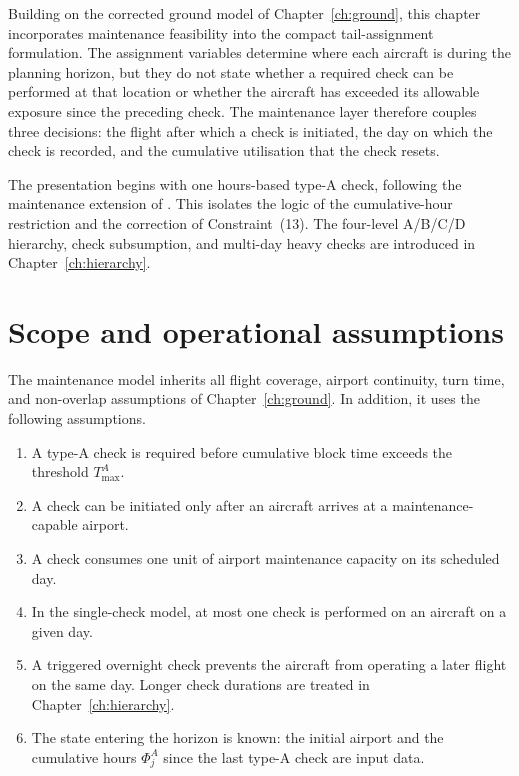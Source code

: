 Building on the corrected ground model of Chapter~\ref{ch:ground}, this
chapter incorporates maintenance feasibility into the compact tail-assignment
formulation. The assignment variables determine where each aircraft is during
the planning horizon, but they do not state whether a required check can be
performed at that location or whether the aircraft has exceeded its allowable
exposure since the preceding check. The maintenance layer therefore couples
three decisions: the flight after which a check is initiated, the day on which
the check is recorded, and the cumulative utilisation that the check resets.

The presentation begins with one hours-based type-A check, following the
maintenance extension of \citet{khaled2018compact}. This isolates the logic of
the cumulative-hour restriction and the correction of Constraint~(13). The
four-level A/B/C/D hierarchy, check subsumption, and multi-day heavy checks are
introduced in Chapter~\ref{ch:hierarchy}.

\section{Scope and operational assumptions}
\label{sec:maintenance}

The maintenance model inherits all flight coverage, airport continuity, turn
time, and non-overlap assumptions of Chapter~\ref{ch:ground}. In addition, it
uses the following assumptions.
\begin{enumerate}
    \item A type-A check is required before cumulative block time exceeds the
    threshold $T_{\max}^{A}$.
    \item A check can be initiated only after an aircraft arrives at a
    maintenance-capable airport.
    \item A check consumes one unit of airport maintenance capacity on its
    scheduled day.
    \item In the single-check model, at most one check is performed on an
    aircraft on a given day.
    \item A triggered overnight check prevents the aircraft from operating a
    later flight on the same day. Longer check durations are treated in
    Chapter~\ref{ch:hierarchy}.
    \item The state entering the horizon is known: the initial airport and the
    cumulative hours $\Phi_j^A$ since the last type-A check are input data.
\end{enumerate}

